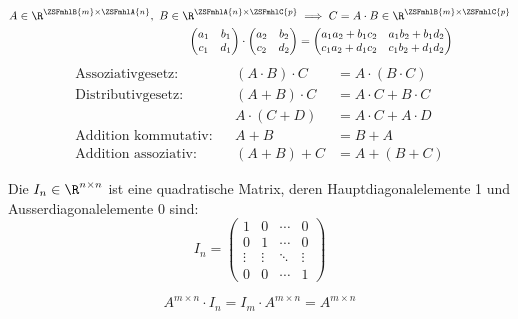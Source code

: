 \begin{formulabox}
  \[
  \begin{aligned}
    A \in \R^{\ZSFmhlB{m} \times \ZSFmhlA{n}}, \ B \in \R^{\ZSFmhlA{n} \times \ZSFmhlC{p}} &\implies C = A \cdot B \in \R^{\ZSFmhlB{m} \times \ZSFmhlC{p}} \\
    \begin{pmatrix}
      a_1 & b_1 \\
      c_1 & d_1
    \end{pmatrix}
    \cdot
    \begin{pmatrix}
      a_2 & b_2 \\
      c_2 & d_2
    \end{pmatrix}
    &=
    \begin{pmatrix}
      a_1 a_2 + b_1 c_2 & a_1 b_2 + b_1 d_2 \\
      c_1 a_2 + d_1 c_2 & c_1 b_2 + d_1 d_2
    \end{pmatrix}
  \end{aligned}
  \]
  \[
  \begin{aligned}
    \text{Assoziativgesetz:} && (A \cdot B) \cdot C &= A \cdot (B \cdot C) \\
    \text{Distributivgesetz:} && (A + B) \cdot C &= A \cdot C + B \cdot C \\
    && A \cdot (C + D) &= A \cdot C + A \cdot D \\
    \text{Addition kommutativ:} && A + B &= B + A \\
    \text{Addition assoziativ:} && (A + B) + C &= A + (B + C)
  \end{aligned}
  \]
  \ZSFsep
\end{formulabox}


\begin{defbox}[Identitätsmatrix]
%
Die  $I_n \in \R^{n \times n}$ ist eine quadratische Matrix, deren Hauptdiagonalelemente 1 und Ausserdiagonalelemente 0 sind:
\[
I_n = \begin{pmatrix}
  1 & 0 & \dotsm & 0 \\
  0 & 1 & \dotsm & 0 \\
  \vdots & \vdots & \ddots & \vdots \\
  0 & 0 & \dotsm & 1
\end{pmatrix}
\]
\end{defbox}
\begin{formulabox}
  \[ A^{m \times n} \cdot I_n = I_m \cdot A^{m \times n} = A^{m \times n} \]
\end{formulabox}

